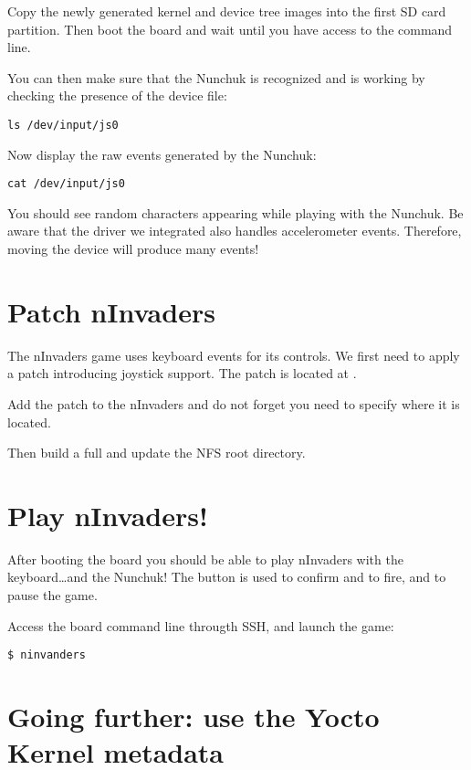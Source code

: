Copy the newly generated kernel and device tree images into the first SD card
partition. Then boot the board and wait until you have access to the
 command line.

You can then make sure that the Nunchuk is recognized and is working by
checking the presence of the  device file:
\begin{verbatim}
ls /dev/input/js0
\end{verbatim}

Now display the raw events generated by the Nunchuk:
\begin{verbatim}
cat /dev/input/js0
\end{verbatim}

You should see random characters appearing while playing with the Nunchuk. Be
aware that the driver we integrated also handles accelerometer events. Therefore,
moving the device will produce many events!

\section{Patch nInvaders}

The nInvaders game uses keyboard events for its controls. We first need to apply
a patch introducing joystick support. The patch is located at
.

Add the patch to the nInvaders  and do not forget you need to
specify where it is located.

Then build a full  and update the NFS root
directory.

\section{Play nInvaders!}

After booting the board you should be able to play nInvaders with the
keyboard\dots and the Nunchuk! The  button is used to confirm and to
fire, and  to pause the game.

Access the board command line througth SSH, and launch the game:
\begin{verbatim}
$ ninvanders
\end{verbatim}

\section{Going further: use the Yocto Kernel metadata}

